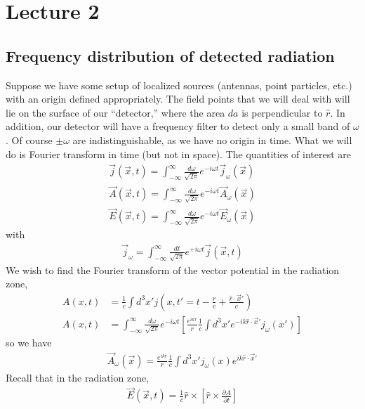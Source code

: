 \section{Lecture 2}

\subsection{Frequency distribution of detected radiation}

Suppose we have some setup of localized sources (antennas, point particles, etc.) with an origin defined appropriately. The field points that we will deal
with will lie on the surface of our ``detector,'' where the area $da$ is perpendicular to $\hat{r}$. In addition, our detector will have a frequency filter
to detect only a small band of $\omega$. Of course $\pm\omega$ are indistinguishable, as we have no origin in time. What we will do is Fourier transform in
time (but not in space). The quantities of interest are
\begin{align*}
    \vec{j}(\vec{x},t)=\int_{-\infty}^\infty \frac{d\omega}{\sqrt{2\pi}}e^{-i\omega t}\vec{j}_\omega(\vec{x})\\
    \vec{A}(\vec{x},t)=\int_{-\infty}^\infty \frac{d\omega}{\sqrt{2\pi}}e^{-i\omega t}\vec{A}_\omega(\vec{x})\\
    \vec{E}(\vec{x},t)=\int_{-\infty}^\infty \frac{d\omega}{\sqrt{2\pi}}e^{-i\omega t}\vec{E}_\omega(\vec{x})
\end{align*}
with
\begin{align*}
    \vec{j}_\omega=\int_{-\infty}^\infty \frac{dt}{\sqrt{2\pi}}e^{+i\omega t}\vec{j}(\vec{x},t)
\end{align*}
We wish to find the Fourier transform of the vector potential in the radiation zone,
\begin{align*}
    A(x,t)&=\frac{1}{c}\int d^3x' j(x,t'=t-\frac{r}{c}+\frac{\hat{r}\cdot\vec{x}'}{c})\\
    A(x,t)&=\int_{-\infty}^\infty \frac{d\omega}{\sqrt{2\pi}}e^{-i\omega t}\left[ \frac{e^{ikr}}{r}\frac{1}{c}\int d^3x' e^{-ik\hat{r}\cdot \vec{x}'} j_\omega(x') \right]
\end{align*}
so we have
\begin{align*}
    \vec{A}_\omega(\vec{x})=\frac{e^{ikr}}{r}\frac{1}{c}\int d^3x' j_\omega(x) e^{ik\hat{r}\cdot\vec{x}'}
\end{align*}
Recall that in the radiation zone,
\begin{align*}
    \vec{E}(\vec{x},t)=\frac{1}{c}\hat{r}\times\left[ \hat{r}\times\frac{\partial A}{\partial t} \right]
\end{align*}
